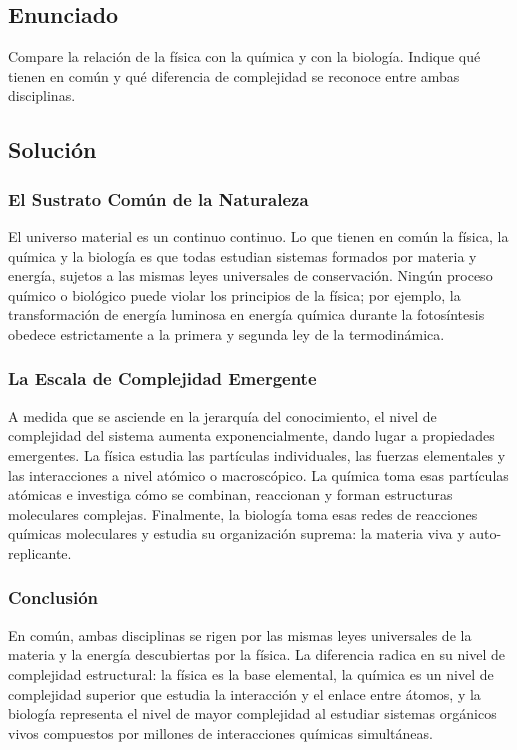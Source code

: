 \documentclass[12pt, a4paper]{article}
\begin{document}
\newpage

\subsection*{Enunciado}
Compare la relación de la física con la química y con la biología. Indique qué tienen en común y qué diferencia de complejidad se reconoce entre ambas disciplinas.

\subsection*{Solución}

\subsubsection*{El Sustrato Común de la Naturaleza}
El universo material es un continuo continuo. Lo que tienen en común la física, la química y la biología es que todas estudian sistemas formados por materia y energía, sujetos a las mismas leyes universales de conservación. Ningún proceso químico o biológico puede violar los principios de la física; por ejemplo, la transformación de energía luminosa en energía química durante la fotosíntesis obedece estrictamente a la primera y segunda ley de la termodinámica.

\subsubsection*{La Escala de Complejidad Emergente}
A medida que se asciende en la jerarquía del conocimiento, el nivel de complejidad del sistema aumenta exponencialmente, dando lugar a propiedades emergentes. La física estudia las partículas individuales, las fuerzas elementales y las interacciones a nivel atómico o macroscópico. La química toma esas partículas atómicas e investiga cómo se combinan, reaccionan y forman estructuras moleculares complejas. Finalmente, la biología toma esas redes de reacciones químicas moleculares y estudia su organización suprema: la materia viva y auto-replicante.

\subsubsection*{Conclusión}
En común, ambas disciplinas se rigen por las mismas leyes universales de la materia y la energía descubiertas por la física. La diferencia radica en su nivel de complejidad estructural: la física es la base elemental, la química es un nivel de complejidad superior que estudia la interacción y el enlace entre átomos, y la biología representa el nivel de mayor complejidad al estudiar sistemas orgánicos vivos compuestos por millones de interacciones químicas simultáneas.
\end{document}
